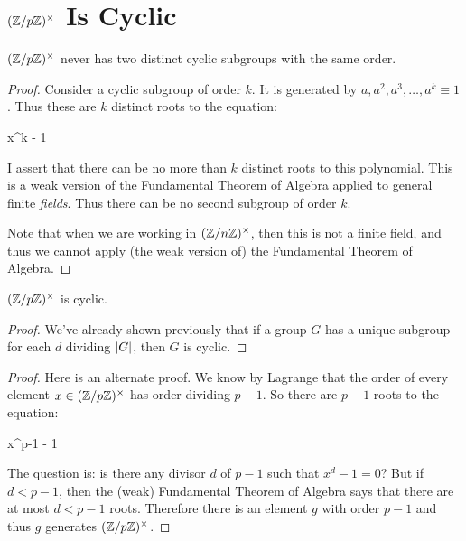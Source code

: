 \section{$\mathopen{}\left( {\mathbb{Z} / p\mathbb{Z}} \right)\mathclose{}^\times$ Is Cyclic}

\begin{lemma}
  $\mathopen{}\left( {\mathbb{Z} / p\mathbb{Z}} \right)\mathclose{}^\times$ never has two distinct cyclic subgroups with the same order.
\end{lemma}

\begin{proof}
  Consider a cyclic subgroup of order $k$. It is generated by $a, a^2,
  a^3, \ldots, a^k \equiv 1$. Thus these are $k$ distinct roots to the
  equation:

  \begin{nedqn}
    x^k - 1
  \end{nedqn}

  \noindent
  I assert that there can be no more than $k$ distinct roots to this
  polynomial. This is a weak version of the Fundamental Theorem of
  Algebra applied to general finite \emph{fields}. Thus there can be no
  second subgroup of order $k$.

  Note that when we are working in $\mathopen{}\left( {\mathbb{Z} / n\mathbb{Z}} \right)\mathclose{}^\times$, then this is not a finite
  field, and thus we cannot apply (the weak version of) the Fundamental
  Theorem of Algebra.
\end{proof}

\begin{corollary}
  $\mathopen{}\left( {\mathbb{Z} / p\mathbb{Z}} \right)\mathclose{}^\times$ is cyclic.
\end{corollary}

\begin{proof}
  We've already shown previously that if a group $G$ has a unique
  subgroup for each $d$ dividing $|G|$, then $G$ is cyclic.
\end{proof}

\begin{proof}
  Here is an alternate proof. We know by Lagrange that the order of
  every element $x \in \mathopen{}\left( {\mathbb{Z} / p\mathbb{Z}} \right)\mathclose{}^\times$ has order dividing $p-1$. So there are
  $p-1$ roots to the equation:

  \begin{nedqn}
    x^{p-1} - 1
  \end{nedqn}

  The question is: is there any divisor $d$ of $p-1$ such that $x^d - 1
  = 0$? But if $d < p-1$, then the (weak) Fundamental Theorem of Algebra
  says that there are at most $d < p-1$ roots. Therefore there is an
  element $g$ with order $p-1$ and thus $g$ generates $\mathopen{}\left( {\mathbb{Z} / p\mathbb{Z}} \right)\mathclose{}^\times$.
\end{proof}

